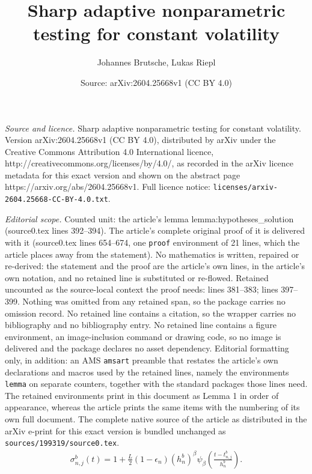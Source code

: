 \documentclass[10pt,a4paper]{amsart}
\title{Sharp adaptive nonparametric testing for constant volatility}
\author{Johannes Brutsche, Lukas Riepl}
\date{Source: arXiv:2604.25668v1 (CC BY 4.0)}
\begin{document}
\maketitle

\noindent\emph{Source and licence.} Sharp adaptive nonparametric testing for constant volatility. Version arXiv:2604.25668v1 (CC BY 4.0), distributed by arXiv under the Creative Commons Attribution 4.0 International licence, http://creativecommons.org/licenses/by/4.0/, as recorded in the arXiv licence metadata for this exact version and shown on the abstract page https://arxiv.org/abs/2604.25668v1. Full licence notice: \texttt{licenses/arxiv-2604.25668-CC-BY-4.0.txt}.\par\smallskip

\noindent\textit{Editorial scope.} Counted unit: the article's lemma lemma:hypotheses\_solution (source0.tex lines 392--394). The article's complete original proof of it is delivered with it (source0.tex lines 654--674, one \texttt{proof} environment of 21 lines, which the article places away from the statement). No mathematics is written, repaired or re-derived: the statement and the proof are the article's own lines, in the article's own notation, and no retained line is substituted or re-flowed.  Retained uncounted as the source-local context the proof needs: lines 381--383; lines 397--399.  Nothing was omitted from any retained span, so the package carries no omission record.  No retained line contains a citation, so the wrapper carries no bibliography and no bibliography entry.  No retained line contains a figure environment, an image-inclusion command or drawing code, so no image is delivered and the package declares no asset dependency.  Editorial formatting only, in addition: an AMS \texttt{amsart} preamble that restates the article's own declarations and macros used by the retained lines, namely the environments \texttt{lemma} on separate counters, together with the standard packages those lines need.  The retained environments print in this document as Lemma 1 in order of appearance, whereas the article prints the same items with the numbering of its own full document.  The complete native source of the article as distributed in the arXiv e-print for this exact version is bundled unchanged as \texttt{sources/199319/source0.tex}.
\begin{align}\label{eq:sigma_j}
 \sigma_{n,j}^b(t) = 1+\frac{L}{2}(1-\epsilon_n)(h_n^b)^\beta \psi_\beta\left(\frac{t-t_{n,j}^b}{h_n^b}\right).
\end{align} 
\end{document}
